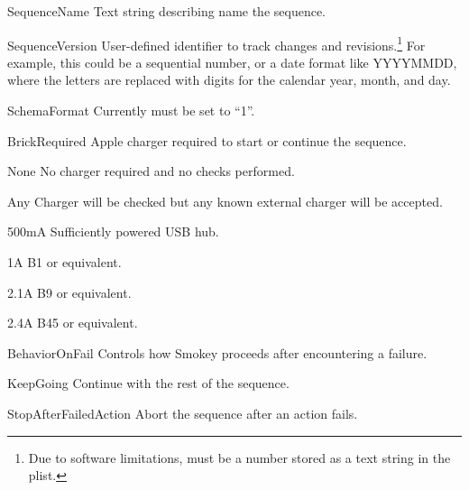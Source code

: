\begin{Property}

\item[SequenceName] Text string describing name the sequence.

\item[SequenceVersion] User-defined identifier to track changes and
revisions.\footnote{Due to software limitations,  must be
a number stored as a text string in the plist.} For example, this could be a
sequential number, or a date format like YYYYMMDD, where the letters are
replaced with digits for the calendar year, month, and day.

\item[SchemaFormat] Currently must be set to ``1''.

\item[BrickRequired] Apple charger required to start or continue the sequence.

	\begin{Definition}

	\item[None] No charger required and no checks performed.

	\item[Any] Charger will be checked but any known external charger will
	be accepted.

	\item[500mA] Sufficiently powered USB hub.

	\item[1A] B1 or equivalent.

	\item[2.1A] B9 or equivalent.

	\item[2.4A] B45 or equivalent.

	\end{Definition}

\item[BehaviorOnFail] Controls how Smokey proceeds after encountering a
failure.

	\begin{Definition}

	\item[KeepGoing] Continue with the rest of the sequence.

	\item[StopAfterFailedAction] Abort the sequence after an action fails.

	\end{Definition}

\end{Property}

